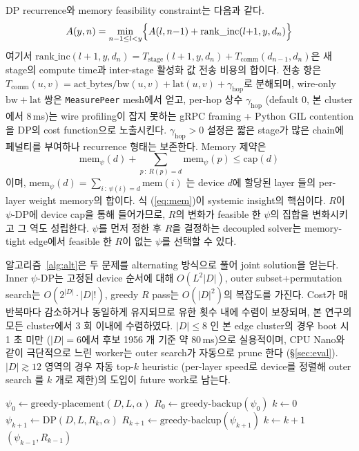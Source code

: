 \documentclass[10pt,twocolumn,a4paper]{article}
\begin{document}
DP recurrence와 memory feasibility constraint는 다음과 같다.
\begin{equation}\label{eq:dp}
  A(y, n) = \min_{n-1 \leq l < y}
  \Bigl\{ A(l, n{-}1) + \mathrm{rank\_inc}(l{+}1, y, d_n) \Bigr\}
\end{equation}
여기서 $\mathrm{rank\_inc}(l{+}1, y, d_n) = T_{\text{stage}}(l{+}1, y, d_n)
+ T_{\text{comm}}(d_{n-1}, d_n)$은 새 stage의 compute time과
inter-stage 활성화 값 전송 비용의 합이다. 전송 항은
$T_{\text{comm}}(u, v) = \mathrm{act\_bytes}/\mathrm{bw}(u, v) +
\mathrm{lat}(u, v) + \gamma_{\mathrm{hop}}$로 분해되며, wire-only
$\mathrm{bw} + \mathrm{lat}$ 쌍은 \texttt{MeasurePeer} mesh에서
얻고, per-hop 상수 $\gamma_{\mathrm{hop}}$ (default $0$, 본 cluster
에서 $8$\,ms)는 wire profiling이 잡지 못하는 gRPC framing + Python
GIL contention을 DP의 cost function으로 노출시킨다.
$\gamma_{\mathrm{hop}}\!>\!0$ 설정은 짧은 stage가 많은 chain에
페널티를 부여하나 recurrence 형태는 보존한다. Memory 제약은
\begin{equation}\label{eq:mem}
  \mathrm{mem}_\psi(d) + \sum_{p\,:\,R(p)=d} \mathrm{mem}_\psi(p) \leq \mathrm{cap}(d)
\end{equation}
이며, $\mathrm{mem}_\psi(d) = \sum_{i\,:\,\psi(i)=d} \mathrm{mem}(i)$
는 device $d$에 할당된 layer 들의 per-layer weight memory의 합이다.
식 (\ref{eq:mem})이 systemic insight의 핵심이다. $R$이 $\psi$-DP에 device
cap을 통해 들어가므로, $R$의 변화가 feasible 한 $\psi$의 집합을
변화시키고 그 역도 성립한다. $\psi$를 먼저 정한 후 $R$을 결정하는
decoupled solver는 memory-tight edge에서 feasible 한 $R$이 없는
$\psi$를 선택할 수 있다.

알고리즘~\ref{alg:alt}은 두 문제를 alternating 방식으로 풀어 joint
solution을 얻는다. Inner $\psi$-DP는 고정된 device 순서에 대해
$O(L^2 |D|)$, outer subset+permutation search는
$O(2^{|D|} \cdot |D|!)$, greedy $R$ pass는 $O(|D|^2)$의 복잡도를
가진다. Cost가 매 반복마다 감소하거나 동일하게 유지되므로 유한
횟수 내에 수렴이 보장되며, 본 연구의 모든 cluster에서 3 회 이내에
수렴하였다. $|D| \leq 8$ 인 본 edge cluster의 경우 boot 시 1 초 미만
($|D|\!=\!6$에서 후보 1956 개 기준 약 $80$\,ms)으로 실용적이며,
CPU Nano와 같이 극단적으로 느린 worker는 outer search가 자동으로
prune 한다 (\S\ref{sec:eval}). $|D| \gtrsim 12$ 영역의 경우 자동
top-$k$ heuristic (per-layer speed로 device를 정렬해 outer search
를 $k$ 개로 제한)의 도입이 future work로 남는다.

\begin{algorithm}[t]
  \caption{Alternating \texorpdfstring{$\psi$+$R$}{psi+R} optimization}
  \label{alg:alt}
  \begin{algorithmic}[1]
    \State $\psi_0 \gets \mathrm{greedy\text{-}placement}(D, L, \alpha)$
    \State $R_0 \gets \mathrm{greedy\text{-}backup}(\psi_0)$
    \State $k \gets 0$
    \Repeat
      \State $\psi_{k+1} \gets \mathrm{DP}(D, L, R_k, \alpha)$
      \State $R_{k+1} \gets \mathrm{greedy\text{-}backup}(\psi_{k+1})$
      \State $k \gets k + 1$
    \State \Return $(\psi_{k-1}, R_{k-1})$
  \end{algorithmic}
\end{algorithm}
\end{document}
